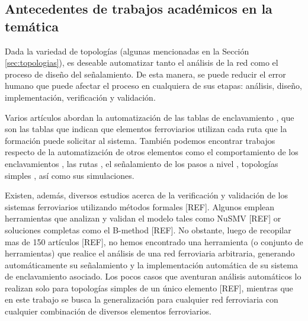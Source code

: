 \subsection{Antecedentes de trabajos académicos en la temática}
\label{sec:estudios}
    Dada la variedad de topologías (algunas mencionadas en la Sección \ref{sec:topologias}), es deseable automatizar tanto el análisis de la red como el proceso de diseño del señalamiento. De esta manera, se puede reducir el error humano que puede afectar el proceso en cualquiera de sus etapas: análisis, diseño, implementación, verificación y validación.

    Varios artículos abordan la automatización de las tablas de enclavamiento \cite{Paper_2,Paper_162,Paper_182}, que son las tablas que indican que elementos ferroviarios utilizan cada ruta que la formación puede solicitar al sistema. También podemos encontrar trabajos respecto de la automatización de otros elementos como el comportamiento de los enclavamientos \cite{Paper_99,Papaer_158,Paper_182,Paper_197}, las rutas \cite{Papaer_114}, el señalamiento de los pasos a nivel \cite{Paper_85,Paper_86}, topologías simples \cite{Paper_93.Paper_162}, así como sus simulaciones.

    Existen, además, diversos estudios acerca de la verificación y validación de los sistemas ferroviarios utilizando métodos formales [REF]. Algunos emplean herramientas que analizan y validan el modelo tales como NuSMV [REF] or soluciones completas como el B-method [REF]. No obstante, luego de recopilar mas de 150 artículos [REF], no hemos encontrado una herramienta (o conjunto de herramientas) que realice el análisis de una red ferroviaria arbitraria, generando automáticamente su señalamiento y la implementación automática de su sistema de enclavamiento asociado. Los pocos casos que aventuran análisis automáticos lo realizan solo para topologías simples de un único elemento [REF], mientras que en este trabajo se busca la generalización para cualquier red ferroviaria con cualquier combinación de diversos elementos ferroviarios.